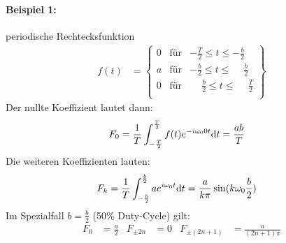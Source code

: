 \paragraph{Beispiel 1:} periodische Rechtecksfunktion
\begin{align*}
	f(t)&=\begin{Bmatrix}
	0&\text{für}&-\frac{T}{2}\leq t\leq -\frac{b}{2}\\
	a&\text{für}&-\frac{b}{2}\leq t\leq \phantom{-}\frac{b}{2}\\
	0&\text{für}&\phantom{-} \frac{b}{2}\leq t\leq \phantom{-}\frac{T}{2}\\
	\end{Bmatrix}
\end{align*}
Der nullte Koeffizient lautet dann:
\begin{align*}
	F_0&=\frac{1}{T}\int_{-\frac{T}{2}}^{\frac{T}{2}}f(t)e^{-i\omega_0 0 t}\mathrm{d} t= \frac{ab}{T}
\end{align*}
Die weiteren Koeffizienten lauten:
\begin{align*}
	F_k&=\frac{1}{T}\int_{-\frac{b}{2}}^{\frac{b}{2}} ae^{i\omega_0 t}\mathrm{d} t=\frac{a}{k\pi}\sin(k\omega_0 \frac{b}{2})
\end{align*}
Im Spezialfall $b=\frac{b}{2}$ (50\% Duty-Cycle) gilt:
\begin{align*}
	F_0&=\frac{a}{2}& F_{\pm 2n}&=0&F_{\pm (2n+1)}&=\frac{a}{(2n+1)\pi}
\end{align*}
